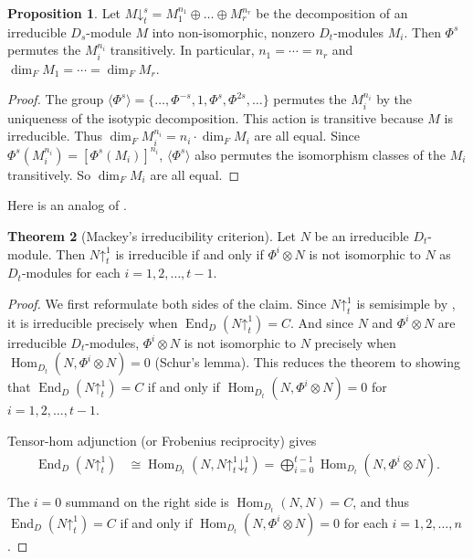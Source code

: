 \documentclass[11pt,reqno]{amsart}
\theoremstyle{definition}
\newtheorem{theorem}{Theorem}[section]
\newtheorem{proposition}[theorem]{Proposition}
\DeclareMathOperator{\Hom}{Hom}
\DeclareMathOperator{\End}{End}
\newcommand{\pda}{\mathord{\downarrow}}
\newcommand{\pua}{\mathord{\uparrow}}
\begin{document}
\begin{proposition}
\label{prop:clifford}
    Let $M\pda^{s}_{t}=M_{1}^{n_{1}}\oplus\dots\oplus M_{r}^{n_{r}}$ be the decomposition of an irreducible $D_s$-module $M$ into non-isomorphic, nonzero $D_{t}$-modules $M_{i}$. Then $\Phi^s$ permutes the $M_{i}^{n_{i}}$ transitively. In particular, $n_{1}=\cdots=n_{r}$ and $\dim_{F} M_{1}=\cdots=\dim_{F} M_{r}$.
\end{proposition}
\begin{proof}
    The group $\langle\Phi^s\rangle=\{\dots,\Phi^{-s},1,\Phi^s,\Phi^{2s},\dots\}$ permutes the $M_{i}^{n_{i}}$ by the uniqueness of the isotypic decomposition. 
    This action is transitive because $M$ is irreducible.
    Thus $\dim_{F} M_{i}^{n_{i}}=n_{i}\cdot\dim_{F} M_{i}$ are all equal.
    Since $\Phi^s(M_i^{n_i}) = [\Phi^s( M_i)]^{n_i}$, $\langle\Phi^s\rangle$ also permutes the isomorphism classes of the $M_{i}$ transitively. So $\dim_{F} M_{i}$ are all equal.
\end{proof}
Here is an analog of \cite[Section 7.4]{serre1977linear}.

\begin{theorem}[Mackey's irreducibility criterion]
\label{thm:mackey-irreducibility-criterion}
    Let $N$ be an irreducible $D_t$-module. Then $N\pua^{1}_{t}$ is irreducible if and only if $\Phi^i\otimes N$ is not isomorphic to $N$ as $D_t$-modules for each $i=1,2,\dots,t-1$. 
\end{theorem}
\begin{proof}
We first reformulate both sides of the claim. Since $N\pua^{1}_{t}$ is semisimple by , it is irreducible precisely when $\End_D(N\pua^{1}_{t}) = C$. And since $N$ and $\Phi^i\otimes N$ are irreducible $D_t$-modules, $\Phi^{i}\otimes N$ is not isomorphic to $N$ precisely when $\Hom_{D_t}(N,\Phi^i\otimes N)=0$ (Schur's lemma).
This reduces the theorem to showing that %
$\End_D(N\pua^1_t)=C$ if and only if $\Hom_{D_t}(N,\Phi^i\otimes N)=0$ for $i=1,2,\dots,t-1$.

Tensor-hom adjunction (or Frobenius reciprocity) gives
    \begin{equation*}
        \begin{split}
            \End_{D}(N\pua^{1}_{t}) 
            & \cong \Hom_{D_t}(N,N\pua^{1}_{t}\pda^{1}_{t}) 
            = \bigoplus_{i=0}^{t-1} \Hom_{D_t}(N,\Phi^i\otimes N).
        \end{split}
    \end{equation*}

The $i=0$ summand on the right side is $\Hom_{D_t}(N,N)=C$, and thus $\End_D(N\pua^1_t)=C$ if and only if $\Hom_{D_t}(N,\Phi^i\otimes N)=0$ for each $i=1,2,\dots,n$.

\end{proof}
\end{document}
